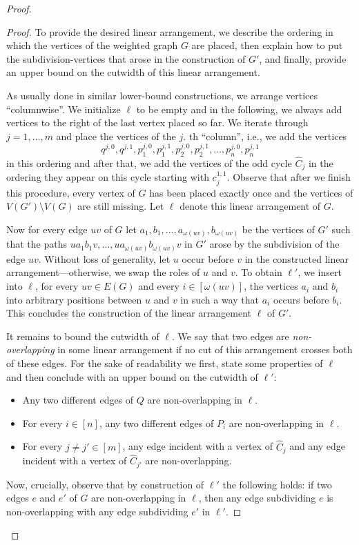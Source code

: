 \documentclass[a4paper,UKenglish,cleveref, autoref, thm-restate]{lipics-v2021}
\begin{document}
\begin{proof}
    \begin{proof}
        To provide the desired linear arrangement, we describe the ordering in which the vertices of the weighted graph $G$ are placed, then explain how to put the subdivision-vertices that arose in the construction of $G'$, and finally, provide an upper bound on the cutwidth of this linear arrangement.

        As usually done in similar lower-bound constructions, we arrange vertices ``columnwise''.
        We initialize $\ell$ to be empty and in the following, we always add vertices to the right of the last vertex placed so far.
        We iterate through $j = 1, \dots, m$ and place the vertices of the $j$. th ``column'', i.e., we add the vertices 
        \[
            q^{j, 0}, q^{j, 1}, p_1^{j, 0}, p_1^{j,1}, p_2^{j, 0}, p_2^{j,1}, \dots, p_n^{j, 0}, p_n^{j,1}
        \]
        in this ordering and after that, we add the vertices of the odd cycle $\hat C_j$ in the ordering they appear on this cycle starting with $c_j^{1,1}$.
        Observe that after we finish this procedure, every vertex of $G$ has been placed exactly once and the vertices of $V(G') \setminus V(G)$ are still missing.
        Let $\ell$ denote this linear arrangement of $G$.

        Now for every edge $uv$ of $G$ let $a_1, b_1, \dots, a_{\omega(uv)}, b_{\omega(uv)}$ be the vertices of $G'$ such that the paths $u a_1 b_1 v, \dots, u a_{\omega(uv)} b_{\omega(uv)} v$ in $G'$ arose by the subdivision of the edge $uv$.
        Without loss of generality, let $u$ occur before $v$ in the constructed linear arrangement---otherwise, we swap the roles of $u$ and $v$.
        To obtain $\ell'$, we insert into $\ell$, for every $uv \in E(G)$ and every $i \in [\omega(uv)]$, the vertices $a_i$ and $b_i$ into arbitrary positions between $u$ and $v$ in such a way that $a_i$ occurs before $b_i$.
        This concludes the construction of the linear arrangement $\ell$ of $G'$.
        
        It remains to bound the cutwidth of $\ell$.
        We say that two edges are \emph{non-overlapping} in some linear arrangement if no cut of this arrangement crosses both of these edges.
        For the sake of readability we first, state some properties of $\ell$ and then conclude with an upper bound on the cutwidth of $\ell'$:
        \begin{itemize}
            \item Any two different edges of $Q$ are non-overlapping in $\ell$.
            \item For every $i \in [n]$, any two different edges of $P_i$ are non-overlapping in $\ell$.
            \item For every $j \neq j' \in [m]$, any edge incident with a vertex of $\hat C_j$ and any edge incident with a vertex of $\hat C_{j'}$ are non-overlapping.
        \end{itemize}
        Now, crucially, observe that by construction of $\ell'$ the following holds: if two edges $e$ and $e'$ of $G$ are non-overlapping in $\ell$, then any edge subdividing $e$ is non-overlapping with any edge subdividing $e'$ in $\ell'$.
        

\end{proof}
\end{proof}
\end{document}
